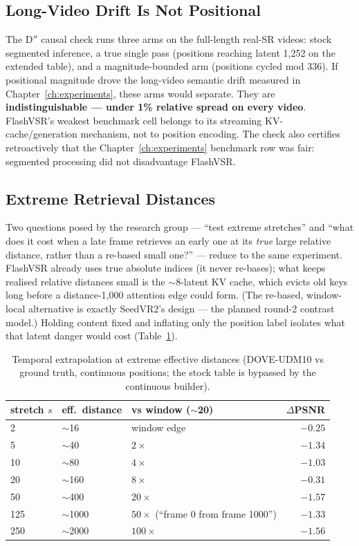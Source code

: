 \subsection{Long-Video Drift Is Not Positional}
\label{sec:rope:drift}

The D$''$ causal check runs three arms on the full-length real-SR videos: stock
segmented inference, a true single pass (positions reaching latent 1{,}252 on the
extended table), and a magnitude-bounded arm (positions cycled mod 336). If
positional magnitude drove the long-video semantic drift measured in
Chapter~\ref{ch:experiments}, these arms would separate. They are
\textbf{indistinguishable --- under 1\% relative spread on every video}.
FlashVSR's weakest benchmark cell belongs to its streaming KV-cache/generation
mechanism, not to position encoding. The check also certifies retroactively that
the Chapter~\ref{ch:experiments} benchmark row was fair: segmented processing did
not disadvantage FlashVSR.

\subsection{Extreme Retrieval Distances}
\label{sec:rope:extreme}

Two questions posed by the research group --- ``test extreme stretches'' and
``what does it cost when a late frame retrieves an early one at its \emph{true}
large relative distance, rather than a re-based small one?'' --- reduce to the
same experiment. FlashVSR already uses true absolute indices (it never re-bases);
what keeps realised relative distances small is the $\sim$8-latent KV cache,
which evicts old keys long before a distance-1{,}000 attention edge could form.
(The re-based, window-local alternative is exactly SeedVR2's design --- the
planned round-2 contrast model.) Holding content fixed and inflating only the
position label isolates what that latent danger would cost
(Table~\ref{tab:rope:extreme}).

\begin{table}[h]
\centering
\caption{Temporal extrapolation at extreme effective distances (DOVE-UDM10 vs
ground truth, continuous positions; the stock table is bypassed by the
continuous builder).}
\label{tab:rope:extreme}
\begin{tabular}{lllr}
\hline
\textbf{stretch $s$} & \textbf{eff.\ distance} & \textbf{vs window ($\sim$20)} & \textbf{$\Delta$PSNR} \\
\hline
2 & $\sim$16 & window edge & $-0.25$ \\
5 & $\sim$40 & $2\times$ & $-1.34$ \\
10 & $\sim$80 & $4\times$ & $-1.03$ \\
20 & $\sim$160 & $8\times$ & $-0.31$ \\
50 & $\sim$400 & $20\times$ & $-1.57$ \\
125 & $\sim$1000 & $50\times$ (``frame 0 from frame 1000'') & $-1.33$ \\
250 & $\sim$2000 & $100\times$ & $-1.56$ \\
\hline
\end{tabular}
\end{table}

